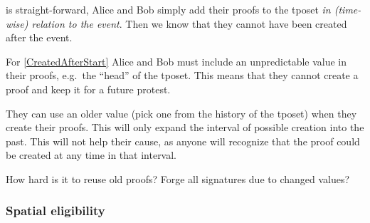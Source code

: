  is straight-forward, Alice and Bob simply add their 
proofs to the \ac{tposet} \emph{in (time-wise) relation to the event}.
Then we know that they cannot have been created after the event.


For \cref{CreatedAfterStart} Alice and Bob must include an unpredictable value 
in their proofs, e.g.\ the \enquote{head} of the \ac{tposet}.
This means that they cannot create a proof and keep it for a future protest.

They can use an older value (pick one from the history of the \ac{tposet}) when 
they create their proofs.
This will only expand the interval of possible creation into the past.
This will not help their cause, as anyone will recognize that the proof could 
be created at any time in that interval.


\begin{question}
  How hard is it to reuse old proofs?
  Forge all signatures due to changed values?
\end{question}

\subsubsection{Spatial eligibility}

